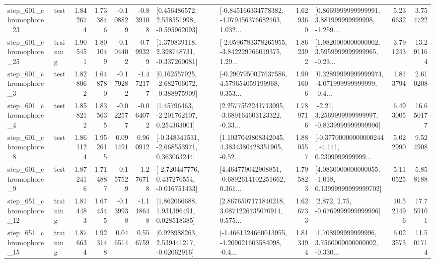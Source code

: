 \begin{tabular}{llrrrrllrlrr}
  step\_601\_chromophore\_23 &      test &      1.842674 &    1.733846 &     -0.108829 & -0.839108 &    [0.456486572, 2.558551998, -0.595962093] &  [-0.845166334778382, -4.079456376682163, 1.032... &       1.629360 &  [0.8669999999999991, 3.881999999999998, -1.259... &            5.236632 &          3.754722 \\
  step\_601\_chromophore\_25 &  training &      1.905451 &    1.801049 &     -0.104402 & -0.799329 &    [1.379839118, 2.398748731, -0.337260081] &  [-2.0596783378265955, -3.842229766019375, 1.29... &       1.862392 &  [1.9820000000000002, 3.5959999999999965, -0.23... &            3.791243 &         13.291164 \\
   step\_601\_chromophore\_3 &      test &      1.828062 &    1.648780 &     -0.179282 & -1.472177 &   [0.162557925, -2.682706072, -0.388975909] &  [-0.2907950027637586, 4.579654059199968, 0.353... &       1.901606 &  [0.32899999999999974, -4.071999999999999, -0.4... &            1.813794 &          2.610208 \\
   step\_601\_chromophore\_4 &      test &      1.858212 &    1.835635 &     -0.022577 & -0.064072 &     [1.45796463, -2.201762107, 0.254363001] &  [2.2577552241713095, -3.689164603123322, -0.33... &       1.789716 &   [-2.21, 3.2569999999999997, -0.8339999999999996] &            6.493005 &         16.650177 \\
   step\_601\_chromophore\_8 &      test &      1.861124 &    1.952615 &      0.091491 &  0.960912 &   [-0.348341531, -2.668553971, 0.363063244] &  [1.1037049808342045, 4.3834380428351905, -0.52... &       1.880557 &  [-0.37700000000000244, -4.141, 0.2309999999999... &            5.022990 &          9.524908 \\
   step\_601\_chromophore\_9 &      test &      1.872416 &    1.714887 &     -0.157529 & -1.276718 &   [-2.720447776, 0.437270554, -0.016751433] &  [4.464779042908851, -0.6892614102251662, 0.361... &       1.795823 &  [4.0830000000000055, -1.018, 0.13999999999999702] &            5.110525 &          5.858188 \\
  step\_651\_chromophore\_12 &  training &      1.814483 &    1.674545 &     -0.139938 & -1.118648 &     [1.862066688, 1.931396491, 0.028518385] &  [2.8676507171840218, 3.0871226735070914, 0.575... &       1.626733 &                 [2.872, 2.75, -0.6769999999999996] &           10.521496 &         17.759101 \\
  step\_651\_chromophore\_15 &  training &      1.876634 &    1.923148 &      0.046514 &  0.556759 &     [0.928988263, 2.539441217, -0.02062916] &  [-1.4661324660013955, -4.209021603584098, -0.4... &       1.813494 &  [1.708999999999996, 3.7560000000000002, -0.330... &            6.023573 &         11.501714 \\

\end{tabular}
